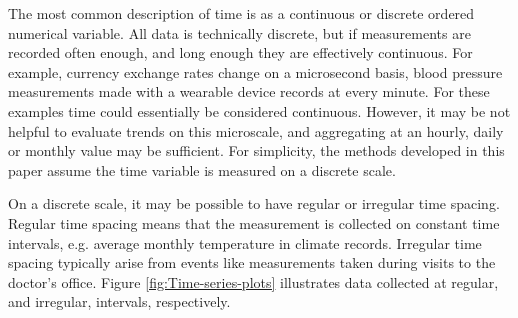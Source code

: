 \documentclass[12pt]{article}
\begin{document}
The most common description of time is as a continuous or discrete ordered numerical variable. All data is technically discrete, but if measurements are recorded often enough, and long enough they are effectively continuous. For example, currency exchange rates change on a microsecond basis, blood pressure measurements made with a wearable device records at every minute. For these examples time could essentially be considered continuous. However, it may be not helpful to evaluate trends on this microscale, and aggregating at an hourly, daily or monthly value may be sufficient. For simplicity, the methods developed in this paper assume the time variable is measured on a discrete scale.


On a discrete scale, it may be possible to have regular or irregular time spacing. Regular time spacing means that the measurement is collected on constant time intervals, e.g. average monthly temperature in climate records. Irregular time spacing typically arise from events like measurements taken during visits to the doctor's office. Figure \ref{fig:Time-series-plots} illustrates data collected at regular, and irregular, intervals, respectively.
\end{document}
